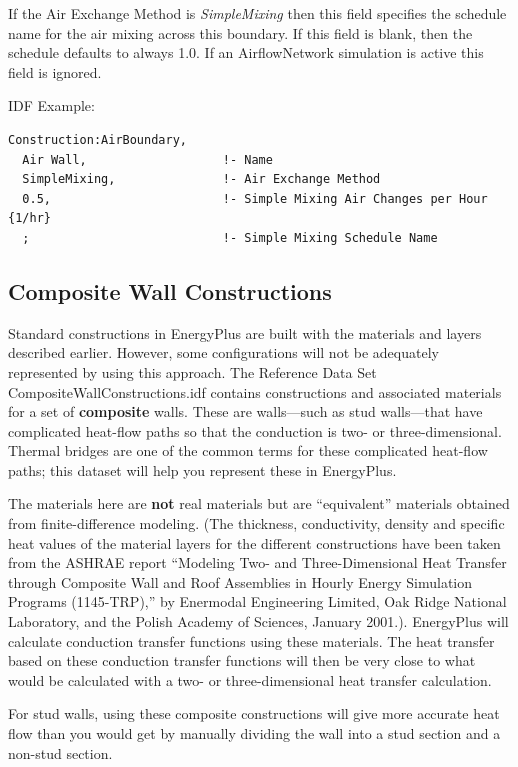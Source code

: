 If the Air Exchange Method is \textit{SimpleMixing} then this field specifies the schedule name for the air mixing across this boundary. If this field is blank, then the schedule defaults to always 1.0. If an AirflowNetwork simulation is active this field is ignored.

IDF Example:

\begin{lstlisting}
Construction:AirBoundary,
  Air Wall,                   !- Name
  SimpleMixing,               !- Air Exchange Method
  0.5,                        !- Simple Mixing Air Changes per Hour {1/hr}
  ;                           !- Simple Mixing Schedule Name
\end{lstlisting}

\subsection{Composite Wall Constructions}\label{composite-wall-constructions}

Standard constructions in EnergyPlus are built with the materials and layers described earlier. However, some configurations will not be adequately represented by using this approach. The Reference Data Set CompositeWallConstructions.idf contains constructions and associated materials for a set of \textbf{composite} walls. These are walls---such as stud walls---that have complicated heat-flow paths so that the conduction is two- or three-dimensional. Thermal bridges are one of the common terms for these complicated heat-flow paths; this dataset will help you represent these in EnergyPlus.

The materials here are \textbf{not} real materials but are ``equivalent'' materials obtained from finite-difference modeling. (The thickness, conductivity, density and specific heat values of the material layers for the different constructions have been taken from the ASHRAE report ``Modeling Two- and Three-Dimensional Heat Transfer through Composite Wall and Roof Assemblies in Hourly Energy Simulation Programs (1145-TRP),'' by Enermodal Engineering Limited, Oak Ridge National Laboratory, and the Polish Academy of Sciences, January 2001.). EnergyPlus will calculate conduction transfer functions using these materials. The heat transfer based on these conduction transfer functions will then be very close to what would be calculated with a two- or three-dimensional heat transfer calculation.

For stud walls, using these composite constructions will give more accurate heat flow than you would get by manually dividing the wall into a stud section and a non-stud section.

